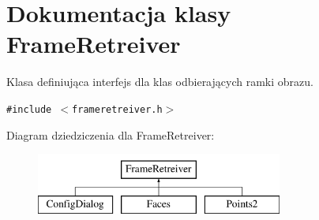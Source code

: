 \hypertarget{class_frame_retreiver}{
\section{Dokumentacja klasy FrameRetreiver}
\label{class_frame_retreiver}
}
Klasa definiująca interfejs dla klas odbierających ramki obrazu.  


{\tt \#include $<$frameretreiver.h$>$}

Diagram dziedziczenia dla FrameRetreiver:\begin{figure}[H]
\begin{center}
\leavevmode
\includegraphics[height=2cm]{class_frame_retreiver}
\end{center}
\end{figure}
